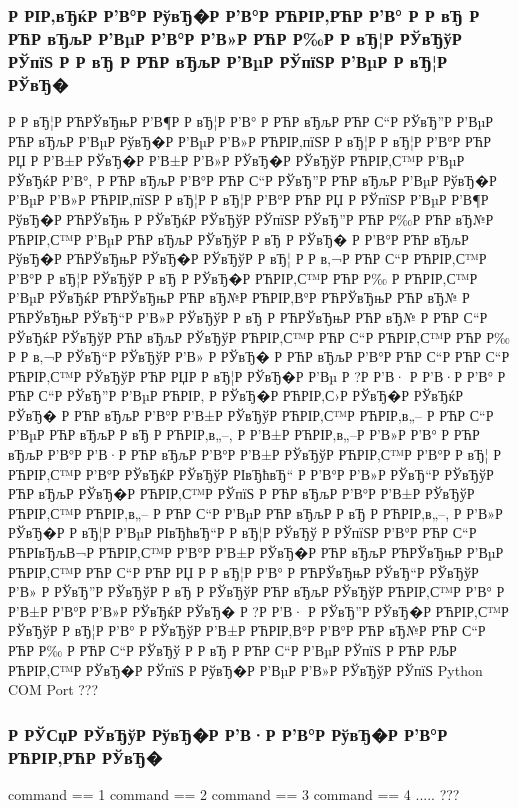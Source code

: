 \documentclass[a4paper,14pt]{extarticle}
\begin{document}
\subsubsection{Р  РІР‚вЂќР  Р’В°Р  РўвЂ�Р  Р’В°Р РЋРІР‚РЋР  Р’В° Р  Р вЂ  Р РЋР вЂљР  Р’ВµР  Р’В°Р  Р’В»Р РЋР Р‰Р  Р вЂ¦Р  РЎвЂўР  РЎпїЅ Р  Р вЂ Р РЋР вЂљР  Р’ВµР  РЎпїЅР  Р’ВµР  Р вЂ¦Р  РЎвЂ�}
Р  Р вЂ¦Р РЋРЎвЂњР  Р’В¶Р  Р вЂ¦Р  Р’В° Р РЋР вЂљР РЋР С“Р  РЎвЂ”Р  Р’ВµР РЋР вЂљР  Р’ВµР  РўвЂ�Р  Р’ВµР  Р’В»Р РЋРІР‚пїЅР  Р вЂ¦Р  Р вЂ¦Р  Р’В°Р РЋР РЏ Р  Р’В±Р  РЎвЂ�Р  Р’В±Р  Р’В»Р  РЎвЂ�Р  РЎвЂўР РЋРІР‚С™Р  Р’ВµР  РЎвЂќР  Р’В°, Р РЋР вЂљР  Р’В°Р РЋР С“Р  РЎвЂ”Р РЋР вЂљР  Р’ВµР  РўвЂ�Р  Р’ВµР  Р’В»Р РЋРІР‚пїЅР  Р вЂ¦Р  Р вЂ¦Р  Р’В°Р РЋР РЏ Р  РЎпїЅР  Р’ВµР  Р’В¶Р  РўвЂ�Р РЋРЎвЂњ Р  РЎвЂќР  РЎвЂўР  РЎпїЅР  РЎвЂ”Р РЋР Р‰Р РЋР вЂ№Р РЋРІР‚С™Р  Р’ВµР РЋР вЂљР  РЎвЂўР  Р вЂ  Р  РЎвЂ� Р  Р’В°Р РЋР вЂљР  РўвЂ�Р РЋРЎвЂњР  РЎвЂ�Р  РЎвЂўР  Р вЂ¦
Р  Р в‚¬Р РЋР С“Р РЋРІР‚С™Р  Р’В°Р  Р вЂ¦Р  РЎвЂўР  Р вЂ Р  РЎвЂ�Р РЋРІР‚С™Р РЋР Р‰ Р РЋРІР‚С™Р  Р’ВµР  РЎвЂќР РЋРЎвЂњР РЋР вЂ№Р РЋРІР‚В°Р РЋРЎвЂњР РЋР вЂ№ Р РЋРЎвЂњР  РЎвЂ“Р  Р’В»Р  РЎвЂўР  Р вЂ Р РЋРЎвЂњР РЋР вЂ№ Р РЋР С“Р  РЎвЂќР  РЎвЂўР РЋР вЂљР  РЎвЂўР РЋРІР‚С™Р РЋР С“Р РЋРІР‚С™Р РЋР Р‰
Р  Р в‚¬Р  РЎвЂ“Р  РЎвЂўР  Р’В»
Р  РЎвЂ� Р РЋР вЂљР  Р’В°Р РЋР С“Р РЋР С“Р РЋРІР‚С™Р  РЎвЂўР РЋР РЏР  Р вЂ¦Р  РЎвЂ�Р  Р’Вµ
Р  ?Р  Р’В· Р  Р’В·Р  Р’В° Р РЋР С“Р  РЎвЂ”Р  Р’ВµР РЋРІР‚ Р  РЎвЂ�Р РЋРІР‚С›Р  РЎвЂ�Р  РЎвЂќР  РЎвЂ� Р РЋР вЂљР  Р’В°Р  Р’В±Р  РЎвЂўР РЋРІР‚С™Р РЋРІР‚в„– Р РЋР С“Р  Р’ВµР РЋР вЂљР  Р вЂ Р РЋРІР‚в„–, Р  Р’В±Р РЋРІР‚в„–Р  Р’В»Р  Р’В° Р РЋР вЂљР  Р’В°Р  Р’В·Р РЋР вЂљР  Р’В°Р  Р’В±Р  РЎвЂўР РЋРІР‚С™Р  Р’В°Р  Р вЂ¦ Р РЋРІР‚С™Р  Р’В°Р  РЎвЂќР  РЎвЂўР  РІвЂћвЂ“ Р  Р’В°Р  Р’В»Р  РЎвЂ“Р  РЎвЂўР РЋР вЂљР  РЎвЂ�Р РЋРІР‚С™Р  РЎпїЅ Р РЋР вЂљР  Р’В°Р  Р’В±Р  РЎвЂўР РЋРІР‚С™Р РЋРІР‚в„– Р РЋР С“Р  Р’ВµР РЋР вЂљР  Р вЂ Р РЋРІР‚в„–, Р  Р’В»Р  РЎвЂ�Р  Р вЂ¦Р  Р’ВµР  РІвЂћвЂ“Р  Р вЂ¦Р  РЎвЂў Р  РЎпїЅР  Р’В°Р РЋР С“Р РЋРІвЂљВ¬Р РЋРІР‚С™Р  Р’В°Р  Р’В±Р  РЎвЂ�Р РЋР вЂљР РЋРЎвЂњР  Р’ВµР РЋРІР‚С™Р РЋР С“Р РЋР РЏ Р  Р вЂ¦Р  Р’В° Р РЋРЎвЂњР  РЎвЂ“Р  РЎвЂўР  Р’В» Р  РЎвЂ”Р  РЎвЂўР  Р вЂ Р  РЎвЂўР РЋР вЂљР  РЎвЂўР РЋРІР‚С™Р  Р’В° Р  Р’В±Р  Р’В°Р  Р’В»Р  РЎвЂќР  РЎвЂ� 
Р  ?Р  Р’В· Р  РЎвЂ”Р  РЎвЂ�Р РЋРІР‚С™Р  РЎвЂўР  Р вЂ¦Р  Р’В° Р  РЎвЂўР  Р’В±Р РЋРІР‚В°Р  Р’В°Р РЋР вЂ№Р РЋР С“Р РЋР Р‰ Р РЋР С“Р  РЎвЂў Р  Р вЂ Р РЋР С“Р  Р’ВµР  РЎпїЅ Р РЋР РЉР РЋРІР‚С™Р  РЎвЂ�Р  РЎпїЅ Р  РўвЂ�Р  Р’ВµР  Р’В»Р  РЎвЂўР  РЎпїЅ
	Python 
	COM Port
	???

\clearpage
\subsubsection{Р  РЎСџР  РЎвЂўР  РўвЂ�Р  Р’В·Р  Р’В°Р  РўвЂ�Р  Р’В°Р РЋРІР‚РЋР  РЎвЂ�}
	command == 1
	command == 2
	command == 3
	command == 4
	.....
	???
\end{document}
